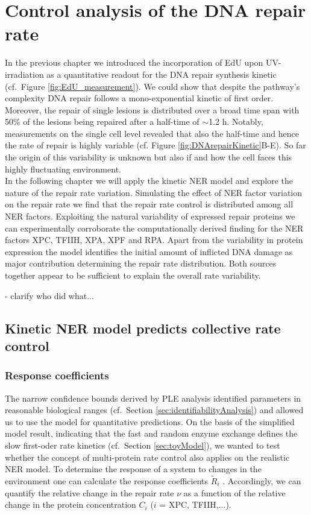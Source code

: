 \chapter{Control analysis of the DNA repair rate}

In the previous chapter we introduced the incorporation of EdU upon UV-irradiation as a quantitative readout for the DNA repair synthesis kinetic (cf.\ Figure \ref{fig:EdU_measurement}). We could show that despite the pathway's complexity DNA repair follows a mono-exponential kinetic of first order. Moreover, the repair of single lesions is distributed over a broad time span with 50\% of the lesions being repaired after a half-time of $\sim$1.2 h. Notably, measurements on the single cell level revealed that also the half-time and hence the rate of repair is highly variable (cf. Figure \ref{fig:DNArepairKinetic}B-E). So far the origin of this variability is unknown but also if and how the cell faces this highly fluctuating environment.\\  
In the following chapter we will apply the kinetic NER model and explore the nature of the repair rate variation. Simulating the effect of NER factor variation on the repair rate we find that the repair rate control is distributed among all NER factors. Exploiting the natural variability of expressed repair proteins we can experimentally corroborate the computationally derived finding for the NER factors XPC, TFIIH, XPA, XPF and RPA. Apart from the variability in protein expression the model identifies the initial amount of inflicted DNA damage as major contribution determining the repair rate distribution. Both sources together appear to be sufficient to explain the overall rate variability.     

- clarify who did what...

\section{Kinetic NER model predicts collective rate control}

 
\subsection{Response coefficients}

The narrow confidence bounds derived by PLE analysis identified parameters in reasonable biological ranges (cf.\ Section \ref{sec:identifiabilityAnalysis}) and allowed us to use the model for quantitative predictions. On the basis of the simplified model result, indicating that the fast and random enzyme exchange defines the slow first-oder rate kinetics (cf.\ Section \ref{sec:toyModel}), we wanted to test whether the concept of multi-protein rate control also applies on the realistic NER model. To determine the response of a system to changes in the environment one can calculate the response coefficients $\tilde{R}_i$ \cite{Hofmeyr1991,Fell1992}. Accordingly, we can quantify the relative change in the repair rate $\nu$ as a function of the relative change in the protein concentration $C_i$ ($i$ = XPC, TFIIH,...).

